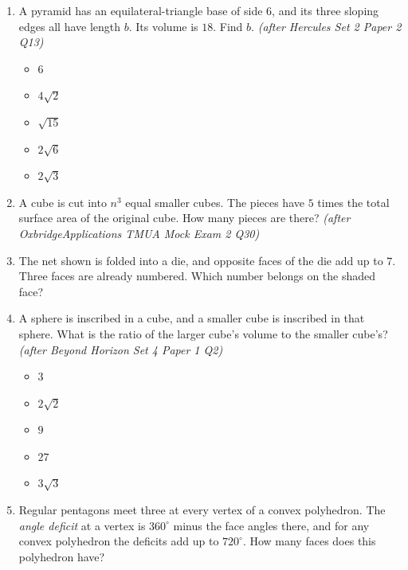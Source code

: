 \documentclass[11pt,a4paper]{article}
\begin{document}
\begin{enumerate}
\item A pyramid has an equilateral-triangle base of side $6$, and its three sloping edges all have length $b$. Its volume is $18$. Find $b$. \textit{\small(after Hercules Set 2 Paper 2 Q13)}
\begin{itemize}
\item[A)] $6$
\item[B)] $4\sqrt2$
\item[C)] $\sqrt{15}$
\item[D)] $2\sqrt6$
\item[E)] $2\sqrt3$
\end{itemize}

\item A cube is cut into $n^3$ equal smaller cubes. The pieces have $5$ times the total surface area of the original cube. How many pieces are there? \textit{\small(after OxbridgeApplications TMUA Mock Exam 2 Q30)}

\item \begin{minipage}[t]{0.60\linewidth}
The net shown is folded into a die, and opposite faces of the die add up to $7$. Three faces are already numbered. Which number belongs on the shaded face?
\end{minipage}\hfill
\begin{minipage}[t]{0.36\linewidth}
\vspace{0pt}
\centering
{}
\end{minipage}

\item A sphere is inscribed in a cube, and a smaller cube is inscribed in that sphere. What is the ratio of the larger cube's volume to the smaller cube's? \textit{\small(after Beyond Horizon Set 4 Paper 1 Q2)}
\begin{itemize}
\item[A)] $3$
\item[B)] $2\sqrt2$
\item[C)] $9$
\item[D)] $27$
\item[E)] $3\sqrt3$
\end{itemize}

\item Regular pentagons meet three at every vertex of a convex polyhedron. The \emph{angle deficit} at a vertex is $360^\circ$ minus the face angles there, and for any convex polyhedron the deficits add up to $720^\circ$. How many faces does this polyhedron have?


\end{enumerate}
\end{document}
